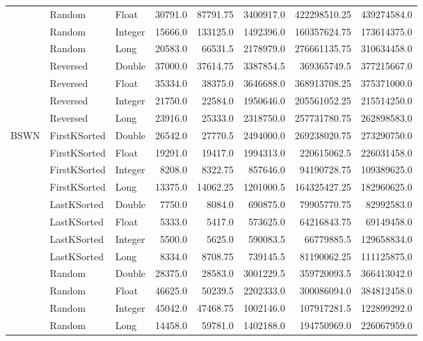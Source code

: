 \documentclass[unicode,11pt,a4paper,oneside,numbers=endperiod,openany]{scrartcl}
\begin{document}
\begin{center}
\begin{longtable}{|l|l|l|r|r|r|r|r|}
            & Random & Float & 30791.0 & 87791.75 & 3400917.0 & 422298510.25 & 439274584.0 \\
            & Random & Integer & 15666.0 & 133125.0 & 1492396.0 & 160357624.75 & 173614375.0 \\
            & Random & Long & 20583.0 & 66531.5 & 2178979.0 & 276661135.75 & 310634458.0 \\
            & Reversed & Double & 37000.0 & 37614.75 & 3387854.5 & 369365749.5 & 377215667.0 \\
            & Reversed & Float & 35334.0 & 38375.0 & 3646688.0 & 368913708.25 & 375371000.0 \\
            & Reversed & Integer & 21750.0 & 22584.0 & 1950646.0 & 205561052.25 & 215514250.0 \\
            & Reversed & Long & 23916.0 & 25333.0 & 2318750.0 & 257731780.75 & 262898583.0 \\
            \hline
            \multirow{16}{*}{BSWN} & FirstKSorted & Double & 26542.0 & 27770.5 & 2494000.0 & 269238020.75 & 273290750.0 \\
            & FirstKSorted & Float & 19291.0 & 19417.0 & 1994313.0 & 220615062.5 & 226031458.0 \\
            & FirstKSorted & Integer & 8208.0 & 8322.75 & 857646.0 & 94190728.75 & 109389625.0 \\
            & FirstKSorted & Long & 13375.0 & 14062.25 & 1201000.5 & 164325427.25 & 182960625.0 \\
            & LastKSorted & Double & 7750.0 & 8084.0 & 690875.0 & 79905770.75 & 82992583.0 \\
            & LastKSorted & Float & 5333.0 & 5417.0 & 573625.0 & 64216843.75 & 69149458.0 \\
            & LastKSorted & Integer & 5500.0 & 5625.0 & 590083.5 & 66779885.5 & 129658834.0 \\
            & LastKSorted & Long & 8334.0 & 8708.75 & 739145.5 & 81190062.25 & 111125875.0 \\
            & Random & Double & 28375.0 & 28583.0 & 3001229.5 & 359720093.5 & 366413042.0 \\
            & Random & Float & 46625.0 & 50239.5 & 2202333.0 & 300086094.0 & 384812458.0 \\
            & Random & Integer & 45042.0 & 47468.75 & 1002146.0 & 107917281.5 & 122899292.0 \\
            & Random & Long & 14458.0 & 59781.0 & 1402188.0 & 194750969.0 & 226067959.0 \\

\end{longtable}
\end{center}
\end{document}
